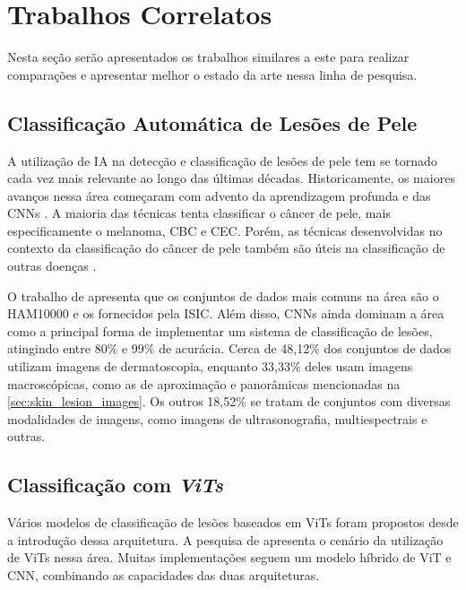 \chapter{Trabalhos Correlatos} %

Nesta seção serão apresentados os trabalhos similares a este para realizar comparações e apresentar melhor o estado da arte nessa linha de pesquisa.

\section{Classificação Automática de Lesões de Pele}

A utilização de \ac{IA} na detecção e classificação de lesões de pele tem se tornado cada vez mais relevante ao longo das últimas décadas. Historicamente, os maiores
avanços nessa área começaram com advento da aprendizagem profunda e das \acp{CNN} \cite{li2019artificial}. A maioria das técnicas tenta classificar o câncer de pele, mais
especificamente o melanoma, \ac{CBC} e \ac{CEC}. Porém, as técnicas desenvolvidas no contexto da classificação do câncer de pele também são úteis na classificação de
outras doenças \cite{okuboyejo2018review}.

O trabalho de \textcite{skin_cancer_ai} apresenta que os conjuntos de dados mais comuns na área são o HAM10000 e os fornecidos pela \ac{ISIC}. Além disso, \acp{CNN} ainda
dominam a área como a principal forma de implementar um sistema de classificação de lesões, atingindo entre 80\% e 99\% de acurácia. Cerca de 48,12\% dos conjuntos de
dados utilizam imagens de dermatoscopia, enquanto 33,33\% deles usam imagens macroscópicas, como as de aproximação e panorâmicas mencionadas na
\autoref{sec:skin_lesion_images}. Os outros 18,52\% se tratam de conjuntos com diversas modalidades de imagens, como imagens de ultrasonografia, multiespectrais e outras.

\section{Classificação com \textit{ViTs}}

Vários modelos de classificação de lesões baseados em \acp{ViT} foram propostos desde a introdução dessa arquitetura. A pesquisa de \textcite{khan2023identifying}
apresenta o cenário da utilização de \acp{ViT} nessa área. Muitas implementações seguem um modelo híbrido de \ac{ViT} e \ac{CNN}, combinando as capacidades das duas
arquiteturas.

